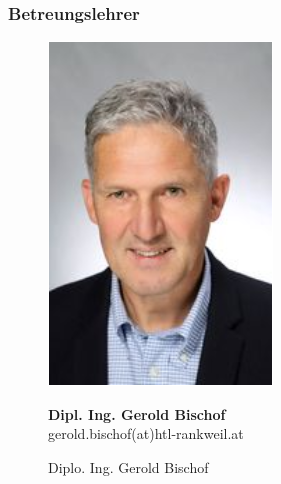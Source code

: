 \subsubsection{ Betreungslehrer}
\begin{figure}[h]
  \centering
  \begin{adjustbox}{valign=c}
    \includegraphics[scale=1]{image/Bischof.png}
  \end{adjustbox}
  \hfill
  \begin{minipage}[b]{0.7\textwidth}
    \textbf{Dipl. Ing. Gerold Bischof} \\ gerold.bischof(at)htl-rankweil.at
  \end{minipage}
  \captionsetup{justification=raggedright,singlelinecheck=false}
  \caption{Diplo. Ing. Gerold Bischof}
\end{figure}

\newpage

